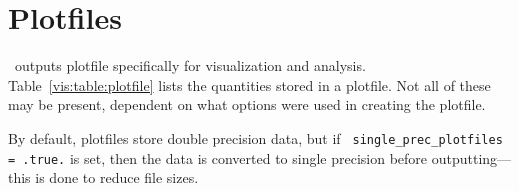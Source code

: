 \section{Plotfiles}

\maestro\ outputs plotfile specifically for visualization and analysis.
Table~\ref{vis:table:plotfile} lists the quantities stored in a plotfile.
Not all of these may be present, dependent on what options were used in 
creating the plotfile.

By default, plotfiles store double precision data, but if {\tt
  single\_prec\_plotfiles = .true.} is set, then the data is converted
to single precision before outputting---this is done to reduce file
sizes.

